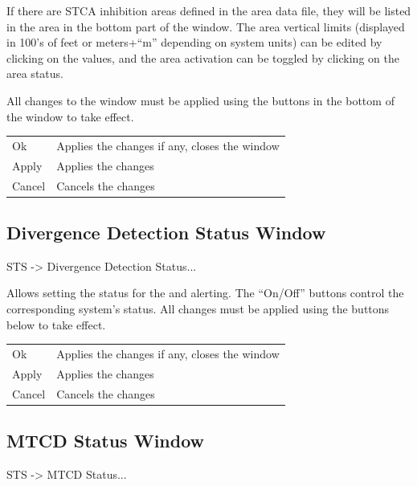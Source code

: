 \documentclass[a4paper,oneside,11pt]{memoir}
\begin{document}
\bigskip

If there are STCA inhibition areas defined in the area data file, they will be listed in the area in the bottom part of the window. The area vertical limits (displayed in 100’s of feet or meters+“m” depending on system units) can be edited by clicking on the values, and the area activation can be toggled by clicking on the area status.

\bigskip

All changes to the window must be applied using the buttons in the bottom of the window to take effect.

\bigskip

\begin{longtable}{p{2.5cm} p{10cm}}
    Ok      & Applies the changes if any, closes the window\\
    Apply   & Applies the changes\\
    Cancel  & Cancels the changes\\
\end{longtable}

\subsection{Divergence Detection Status Window}
\label{win:ddsw}

 STS -> Divergence Detection Status...

\bigskip


Allows setting the status for the  and  alerting. The “On/Off” buttons control the corresponding system’s status. All changes must be applied using the buttons below to take effect.

\begin{longtable}{p{2.5cm} p{10cm}}
    Ok      & Applies the changes if any, closes the window\\
    Apply   & Applies the changes\\
    Cancel  & Cancels the changes\\
\end{longtable}

\subsection{MTCD Status Window}
\label{win:mtcdsw}

 STS -> MTCD Status...
\end{document}
